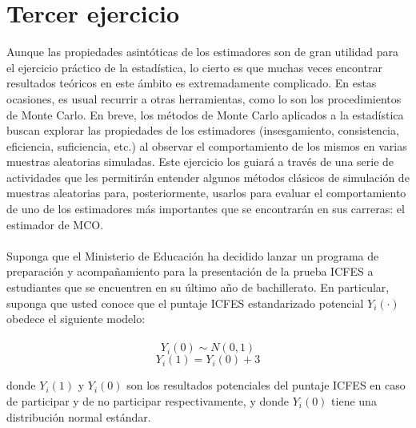 \documentclass[a4paper]{article}
\begin{document}
\bigskip


\section*{Tercer ejercicio}
Aunque las propiedades asintóticas de los estimadores son de gran utilidad para el ejercicio práctico de la estadística, lo cierto es que muchas veces encontrar resultados teóricos en este ámbito es extremadamente complicado. En estas ocasiones, es usual recurrir a otras herramientas, como lo son los procedimientos de Monte Carlo. En breve, los métodos de Monte Carlo aplicados a la estadística buscan explorar las propiedades de los estimadores (insesgamiento, consistencia, eficiencia, suficiencia, etc.) al observar el comportamiento de los mismos en varias muestras aleatorias simuladas. Este ejercicio los guiará a través de una serie de actividades que les permitirán entender algunos métodos clásicos de simulación de muestras aleatorias para, posteriormente, usarlos para evaluar el comportamiento de uno de los estimadores más importantes que se encontrarán en sus carreras: el estimador de MCO.
\\\\
Suponga que el Ministerio de Educación ha decidido lanzar un programa de preparación y acompañamiento para la presentación de la prueba ICFES a estudiantes que se encuentren en su último año de bachillerato. En particular, suponga que usted conoce que el puntaje ICFES estandarizado potencial $Y_{i}(\cdot)$ obedece el siguiente modelo:
\\\\
\begin{equation*}
    Y_{i}(0) \sim N(0,1)
\end{equation*}
\begin{equation*}
    Y_{i}(1) = Y_{i}(0)+3
\end{equation*}

donde $Y_i(1)$ y $Y_i(0)$ son los resultados potenciales del puntaje ICFES en caso de participar y de no participar respectivamente, y donde $Y_i(0)$ tiene una distribución normal estándar.\\
\end{document}
